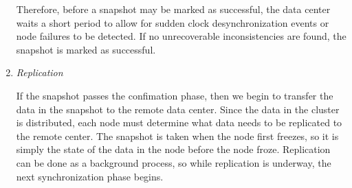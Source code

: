\begin{enumerate}
  Therefore, before a snapshot may be marked as successful, the data
  center waits a short period to allow for sudden clock
  desynchronization events or node failures to be detected. If no
  unrecoverable inconsistencies are found, the snapshot is marked as
  successful.

\item \emph{Replication}
  
  If the snapshot passes the confimation phase, then we begin to
  transfer the data in the snapshot to the remote data center. Since
  the data in the cluster is distributed, each node must determine
  what data needs to be replicated to the remote center. The snapshot
  is taken when the node first freezes, so it is simply the state of
  the data in the node before the node froze. Replication can be done
  as a background process, so while replication is underway, the next
  synchronization phase begins.

\end{enumerate}
